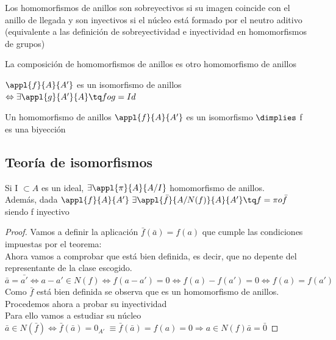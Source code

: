 \documentclass[nochap]{apuntes}
\begin{document}
Los homomorfismos de anillos son sobreyectivos si su imagen coincide con el anillo de llegada y son inyectivos si el núcleo está 
formado por el neutro aditivo (equivalente a las definición de sobreyectividad e inyectividad en homomorfismos de grupos)

\begin{lemma}
 La composición de homomorfismos de anillos es otro homomorfismo de anillos
\end{lemma}

\begin{defn}
 $\appl{f}{A}{A'}$  es un isomorfismo de anillos $\Leftrightarrow \exists \appl{g}{A'}{A} \tq fog = Id$
\end{defn}

\begin{lemma}
 Un homomorfismo de anillos $\appl{f}{A}{A'}$  es un isomorfismo $\dimplies$ f es una biyección
\end{lemma}

\subsection{Teoría de isomorfismos}
\begin{theorem}
Si I $\subset A$  es un ideal, $\exists \appl{\pi}{A}{A/I}$  homomorfismo de anillos.\\
Además, dada  $\appl{f}{A}{A'} \ \exists \appl{\bar{f}}{A/N(f)}{A}{A'} \tq f=\pi o \bar{f}$  siendo f inyectivo
\end{theorem}
\begin{proof}
 Vamos a definir la aplicación $\bar{f}(\bar{a})=f(a)$  que cumple las condiciones impuestas por el teorema:\\
 Ahora vamos a comprobar que está bien definida, es decir, que no depente del representante de la clase escogido.\\
 $\bar{a}=\bar{a'} \Leftrightarrow a-a'\in N(f) \Leftrightarrow f(a-a')=0 \Leftrightarrow f(a)-f(a')=0 \Leftrightarrow f(a)=f(a')$\\
 Como $\bar{f}$  está bien definida se observa que es un homomorfismo de anillos. Procedemos ahora a probar su inyectividad\\
 Para ello vamos a estudiar su núcleo\\
 $\bar{a}\in N(\bar{f}) \Leftrightarrow \bar{f}(\bar{a})=0_{A'} \ \equiv \bar{f}(\bar{a})=f(a)=0 \Rightarrow a \in N(f) \bar{a}=\bar{0}$
\end{proof}
\end{document}

